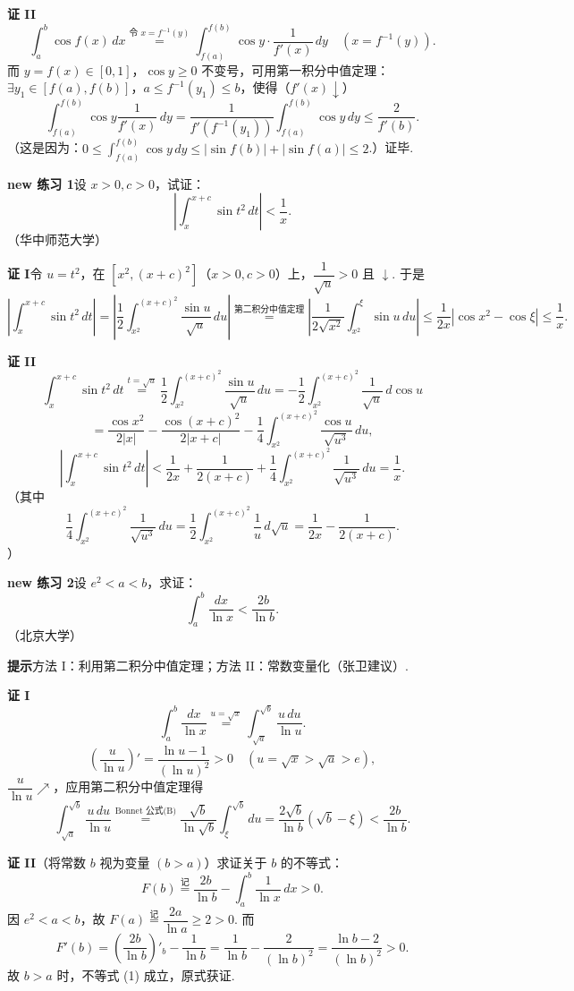 \documentclass[UTF8,12pt,a4paper,fontset=fandol]{ctexart}
\begin{document}
\noindent\textbf{证 II}\quad
\[
\int_a^b\cos f(x)\,dx
\stackrel{\text{令 }x=f^{-1}(y)}{=}
\int_{f(a)}^{f(b)}\cos y\cdot\frac1{f'(x)}\,dy\quad(x=f^{-1}(y)).
\]
而 $y=f(x)\in[0,1]$，$\cos y\ge0$ 不变号，可用第一积分中值定理：$\exists y_1\in[f(a),f(b)]$，$a\le f^{-1}(y_1)\le b$，使得（$f'(x)\downarrow$）
\[
\int_{f(a)}^{f(b)}\cos y\frac1{f'(x)}\,dy
=\frac1{f'(f^{-1}(y_1))}\int_{f(a)}^{f(b)}\cos y\,dy
\le\frac2{f'(b)}.
\]
（这是因为：$0\le\displaystyle\int_{f(a)}^{f(b)}\cos y\,dy\le|\sin f(b)|+|\sin f(a)|\le2$.）证毕.

\noindent\textbf{new 练习 1}\quad 设 $x>0,c>0$，试证：
\[
\left|\int_x^{x+c}\sin t^2\,dt\right|<\frac1x.
\]
（华中师范大学）

\noindent\textbf{证 I}\quad 令 $u=t^2$，在 $[x^2,(x+c)^2]$（$x>0,c>0$）上，$\dfrac1{\sqrt u}>0$ 且 $\downarrow$. 于是
\[
\left|\int_x^{x+c}\sin t^2\,dt\right|
=\left|\frac12\int_{x^2}^{(x+c)^2}\frac{\sin u}{\sqrt u}\,du\right|
\stackrel{\text{第二积分中值定理}}{=}
\left|\frac1{2\sqrt{x^2}}\int_{x^2}^{\xi}\sin u\,du\right|
\le\frac1{2x}|\cos x^2-\cos\xi|\le\frac1x.
\]

\noindent\textbf{证 II}\quad
\[
\int_x^{x+c}\sin t^2\,dt
\stackrel{t=\sqrt u}{=}\frac12\int_{x^2}^{(x+c)^2}\frac{\sin u}{\sqrt u}\,du
=-\frac12\int_{x^2}^{(x+c)^2}\frac1{\sqrt u}\,d\cos u
\]
\[
=\frac{\cos x^2}{2|x|}-\frac{\cos(x+c)^2}{2|x+c|}
-\frac14\int_{x^2}^{(x+c)^2}\frac{\cos u}{\sqrt{u^3}}\,du,
\]
\[
\left|\int_x^{x+c}\sin t^2\,dt\right|
<\frac1{2x}+\frac1{2(x+c)}+\frac14\int_{x^2}^{(x+c)^2}\frac1{\sqrt{u^3}}\,du
=\frac1x.
\]
（其中
\[
\frac14\int_{x^2}^{(x+c)^2}\frac1{\sqrt{u^3}}\,du
=\frac12\int_{x^2}^{(x+c)^2}\frac1u\,d\sqrt u
=\frac1{2x}-\frac1{2(x+c)}.
\]
）

\noindent\textbf{new 练习 2}\quad 设 $e^2<a<b$，求证：
\[
\int_a^b\frac{dx}{\ln x}<\frac{2b}{\ln b}.
\]
（北京大学）

\noindent\textbf{提示}\quad 方法 I：利用第二积分中值定理；方法 II：常数变量化（张卫建议）.

\noindent\textbf{证 I}\quad
\[
\int_a^b\frac{dx}{\ln x}\stackrel{u=\sqrt x}{=}
\int_{\sqrt a}^{\sqrt b}\frac{u\,du}{\ln u}.
\]
\[
\left(\frac u{\ln u}\right)'=\frac{\ln u-1}{(\ln u)^2}>0
\quad(u=\sqrt x>\sqrt a>e),
\]
$\dfrac u{\ln u}\nearrow$，应用第二积分中值定理得
\[
\int_{\sqrt a}^{\sqrt b}\frac{u\,du}{\ln u}
\stackrel{\text{Bonnet 公式(B)}}{=}
\frac{\sqrt b}{\ln\sqrt b}\int_\xi^{\sqrt b}du
=\frac{2\sqrt b}{\ln b}(\sqrt b-\xi)<\frac{2b}{\ln b}.
\]

\noindent\textbf{证 II}\quad （将常数 $b$ 视为变量 $(b>a)$）求证关于 $b$ 的不等式：
\[
F(b)\stackrel{\text{记}}{=}\frac{2b}{\ln b}-\int_a^b\frac1{\ln x}\,dx>0.
\tag{1}
\]
因 $e^2<a<b$，故 $F(a)\stackrel{\text{记}}{=}\dfrac{2a}{\ln a}\ge2>0$. 而
\[
F'(b)=\left(\frac{2b}{\ln b}\right)'_b-\frac1{\ln b}
=\frac1{\ln b}-\frac2{(\ln b)^2}
=\frac{\ln b-2}{(\ln b)^2}>0.
\]
故 $b>a$ 时，不等式 (1) 成立，原式获证.
\end{document}
